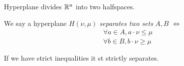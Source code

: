 Hyperplane divides $\mathbb{R}^n$ into two halfspaces.

\begin{definicija}
    We say a hyperplane $H (\nu, \mu)$ \textit{separates two sets} $A, B$ $\iff$
    \begin{align*}
        \forall a \in A, a \cdot \nu \leq \mu \\
        \forall b \in B, b \cdot \nu \geq \mu
    \end{align*}

    If we have strict inequalities it st strictly separates.
\end{definicija}



